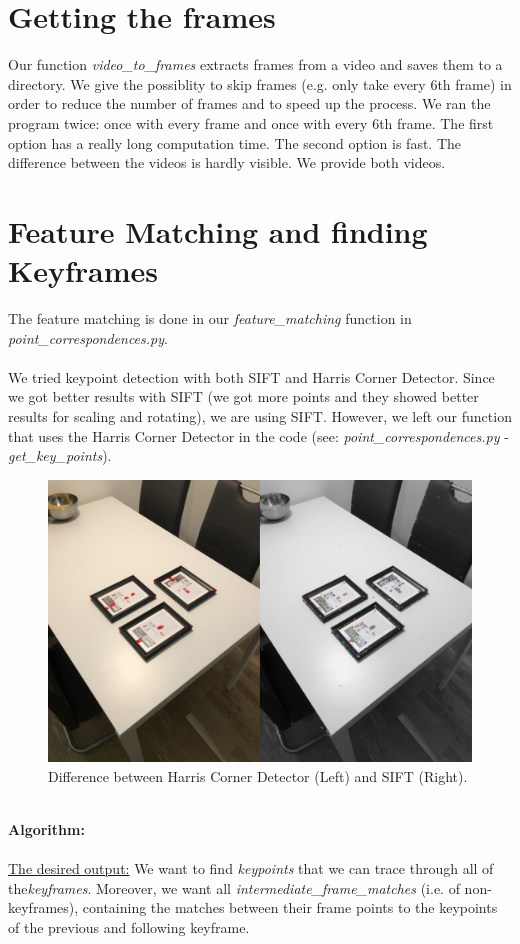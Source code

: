 \documentclass[paper=a4, fontsize=11pt]{scrartcl}
\numberwithin{equation}{section}		%
\numberwithin{figure}{section}			%
\numberwithin{table}{section}				%
\begin{document}
\section*{Getting the frames}
Our function \emph{video\_to\_frames} extracts frames from a video and saves them to a directory. We give the possiblity to skip frames (e.g. only take every 6th frame) in order to reduce the number of frames and to speed up the process. We ran the program twice: once with every frame and once with every 6th frame. The first option has a really long computation time. The second option is fast. The difference between the videos is hardly visible. We provide both videos.

\section*{Feature Matching and finding Keyframes}
The feature matching is done in our \emph{feature\_matching} function in \emph{point\_correspondences.py}.\\\\We tried keypoint detection with both SIFT and Harris Corner Detector. Since we got better results with SIFT (we got more points and they showed better results for scaling and rotating), we are using SIFT. However, we left our function that uses the Harris Corner Detector in the code (see: \emph{point\_correspondences.py} - \emph{get\_key\_points}).
\begin{figure}[h!]
\centering
\includegraphics[width=1\textwidth]{img/hcdvssift}
\caption{Difference between Harris Corner Detector (Left) and SIFT (Right).}
\end{figure}
\\\textbf{Algorithm:}\\\\\underline{The desired output:} We want to find \emph{keypoints} that we can trace through all of the\emph{keyframes}. Moreover, we want all \emph{intermediate\_frame\_matches} (i.e. of non-keyframes), containing the matches between their frame points to the keypoints of the previous and following keyframe.
\end{document}
